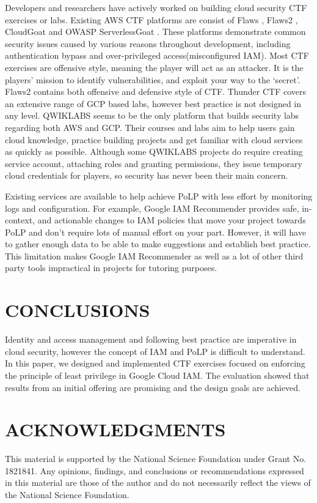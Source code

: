 \documentclass[a4paper,twoside]{article}
\begin{document}
\noindent Developers and researchers have actively worked on building cloud security CTF exercises or labs. Existing AWS CTF platforms are consist of  Flaws \cite{flaws}, Flaws2 \cite{flaws2}, CloudGoat \cite{cloudgoat} and OWASP ServerlessGoat \cite{serverlessgoat}. These platforms demonstrate common security issues caused by various reasons throughout development, including authentication bypass and over-privileged access(misconfigured IAM). Most CTF exercises are offensive style, meaning the player will act as an attacker. It is the players’ mission to identify vulnerabilities, and exploit your way to the ‘secret’. Flaws2 contains both offensive and defensive style of CTF. Thunder CTF \cite{thunder-ctf} covers an extensive range of GCP based labs, however best practice is not designed in any level. QWIKLABS \cite{QWIKLABS} seems to be the only platform that builds security labs regarding both AWS and GCP. Their courses and labs aim to help users gain cloud knowledge, practice building projects and get familiar with cloud services as quickly as possible. Although some QWIKLABS projects do require creating service account, attaching roles and granting permissions, they issue temporary cloud credentials for players, so security has never been their main concern.

Existing services are available to help achieve PoLP with less effort by monitoring logs and configuration. For example, Google IAM Recommender \cite{GoogleLstRec} provides safe, in-context, and actionable changes to IAM policies that move your project towards PoLP and don’t require lots of manual effort on your part. However, it will have to gather enough data to be able to make suggestions and establish best practice. This limitation makes Google IAM Recommender as well as a lot of other third party tools impractical in projects for tutoring purposes.

\section{\uppercase{Conclusions}}
\label{sec:conclusion}

\noindent Identity and access management and following best practice are imperative in cloud security, however the concept of IAM and PoLP is difficult to understand. In this paper, we designed and implemented CTF exercises focused on enforcing the principle of least privilege in Google Cloud IAM. The evaluation showed that results from an initial offering are promising and the design goals are achieved. 

\section*{\uppercase{Acknowledgments}}
\noindent This material is supported by the National Science Foundation under Grant No. 1821841. Any
opinions, findings, and conclusions or recommendations expressed in this material are those of the author and do not necessarily reflect the views of the National Science Foundation.



{\small
}
\end{document}
